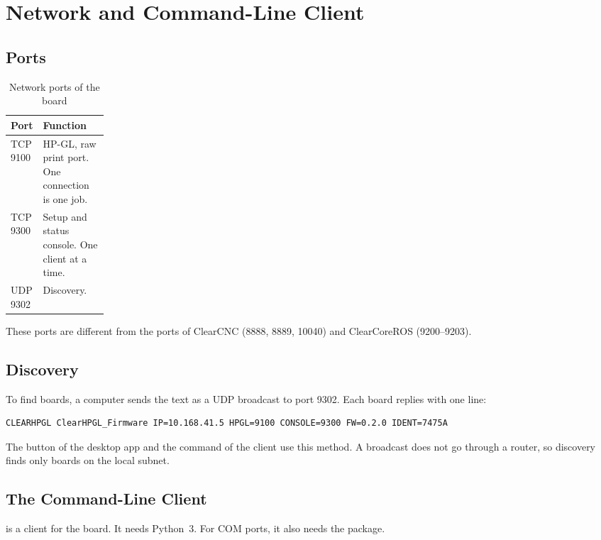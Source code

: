 \chapter{Network and Command-Line Client}\label{app:network}

\section{Ports}

\begin{table}[htbp]
\centering
\caption{Network ports of the board}\label{tab:ports}
\begin{tabularx}{\linewidth}{@{}P{0.16\linewidth}L@{}}
\toprule
\textbf{Port} & \textbf{Function} \\
\midrule
TCP 9100 & HP-GL, raw print port. One connection is one job. \\
TCP 9300 & Setup and status console. One client at a time. \\
UDP 9302 & Discovery. \\
\bottomrule
\end{tabularx}
\end{table}

These ports are different from the ports of ClearCNC (8888, 8889, 10040) and
ClearCoreROS (9200--9203).

\section{Discovery}

To find boards, a computer sends the text  as a
UDP broadcast to port 9302. Each board replies with one line:

\begin{lstlisting}[language=console]
CLEARHPGL ClearHPGL_Firmware IP=10.168.41.5 HPGL=9100 CONSOLE=9300 FW=0.2.0 IDENT=7475A
\end{lstlisting}

The  button of the desktop app and the  command
of the client use this method. A broadcast does not go through a router, so
discovery finds only boards on the local subnet.

\section{The Command-Line Client}

 is a client for the board. It needs
Python~3. For COM ports, it also needs the  package.

